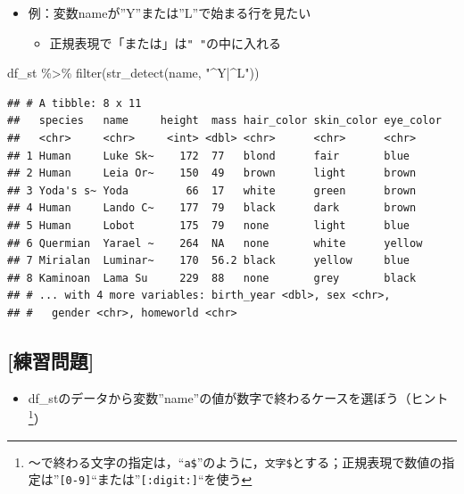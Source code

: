 \documentclass[
  xelatex,ja=standard, b5paper]{bxjsbook}
\newenvironment{Shaded}{\begin{snugshade}}{\end{snugshade}}
\newcommand{\FunctionTok}[1]{\textcolor[rgb]{0.00,0.00,0.00}{#1}}
\newcommand{\NormalTok}[1]{#1}
\newcommand{\SpecialCharTok}[1]{\textcolor[rgb]{0.00,0.00,0.00}{#1}}
\newcommand{\StringTok}[1]{\textcolor[rgb]{0.31,0.60,0.02}{#1}}
\providecommand{\tightlist}{%
  \setlength{\itemsep}{0pt}\setlength{\parskip}{0pt}}
\begin{document}
\begin{itemize}
\tightlist
\item
  例：変数nameが''Y''または''L''で始まる行を見たい

  \begin{itemize}
  \tightlist
  \item
    正規表現で「または」は\texttt{"\ "}の中に入れる
  \end{itemize}
\end{itemize}

\begin{Shaded}
\begin{Highlighting}[]
\NormalTok{df\_st }\SpecialCharTok{\%\textgreater{}\%}
  \FunctionTok{filter}\NormalTok{(}\FunctionTok{str\_detect}\NormalTok{(name, }\StringTok{"\^{}Y|\^{}L"}\NormalTok{))}
\end{Highlighting}
\end{Shaded}

\begin{verbatim}
## # A tibble: 8 x 11
##   species   name     height  mass hair_color skin_color eye_color
##   <chr>     <chr>     <int> <dbl> <chr>      <chr>      <chr>    
## 1 Human     Luke Sk~    172  77   blond      fair       blue     
## 2 Human     Leia Or~    150  49   brown      light      brown    
## 3 Yoda's s~ Yoda         66  17   white      green      brown    
## 4 Human     Lando C~    177  79   black      dark       brown    
## 5 Human     Lobot       175  79   none       light      blue     
## 6 Quermian  Yarael ~    264  NA   none       white      yellow   
## 7 Mirialan  Luminar~    170  56.2 black      yellow     blue     
## 8 Kaminoan  Lama Su     229  88   none       grey       black    
## # ... with 4 more variables: birth_year <dbl>, sex <chr>,
## #   gender <chr>, homeworld <chr>
\end{verbatim}

\hypertarget{ux7df4ux7fd2ux554fux984c-8}{%
\subsection{{[}練習問題{]}}\label{ux7df4ux7fd2ux554fux984c-8}}

\begin{itemize}
\tightlist
\item
  df\_stのデータから変数''name''の値が数字で終わるケースを選ぼう（ヒント\footnote{～で終わる文字の指定は，``\texttt{a\$}''のように，\texttt{文字\$}とする；正規表現で数値の指定は''\texttt{{[}0-9{]}}``または''\texttt{{[}:digit:{]}}``を使う}）
\end{itemize}
\end{document}

